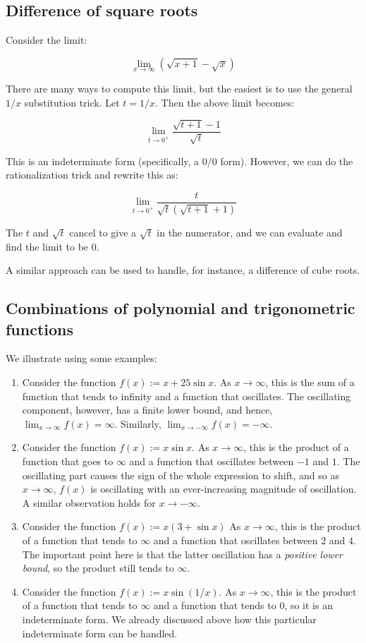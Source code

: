 \documentclass[10pt]{amsart}
\begin{document}
\subsection{Difference of square roots}

Consider the limit:

$$\lim_{x \to \infty}(\sqrt{x + 1} - \sqrt{x})$$

There are many ways to compute this limit, but the easiest is to use
the general $1/x$ substitution trick. Let $t = 1/x$. Then the above
limit becomes:

$$\lim_{t \to 0^+} \frac{\sqrt{t + 1} - 1}{\sqrt{t}}$$

This is an indeterminate form (specifically, a $0/0$ form). However,
we can do the rationalization trick and rewrite this as:

$$\lim_{t \to 0^+} \frac{t}{\sqrt{t}(\sqrt{t + 1} + 1)}$$

The $t$ and $\sqrt{t}$ cancel to give a $\sqrt{t}$ in the numerator,
and we can evaluate and find the limit to be $0$.

A similar approach can be used to handle, for instance, a difference
of cube roots.

\subsection{Combinations of polynomial and trigonometric functions}

We illustrate using some examples:

\begin{enumerate}
\item Consider the function $f(x) := x + 25 \sin x$. As $x \to
  \infty$, this is the sum of a function that tends to infinity and a
  function that oscillates. The oscillating component, however, has a
  finite lower bound, and hence, $\lim_{x \to \infty} f(x) =
  \infty$. Similarly, $\lim_{x \to -\infty} f(x) = -\infty$.
\item Consider the function $f(x) := x\sin x$. As $x \to \infty$, this
  is the product of a function that goes to $\infty$ and a function
  that oscillates between $-1$ and $1$. The oscillating part causes
  the sign of the whole expression to shift, and so as $x \to \infty$,
  $f(x)$ is oscillating with an ever-increasing magnitude of
  oscillation. A similar observation holds for $x \to -\infty$.
\item Consider the function $f(x) := x(3 + \sin x)$ As $x \to \infty$,
  this is the product of a function that tends to $\infty$ and a
  function that oscillates between $2$ and $4$. The important point
  here is that the latter oscillation has a {\em positive lower
    bound}, so the product still tends to $\infty$.
\item Consider the function $f(x) := x \sin(1/x)$. As $x \to \infty$,
  this is the product of a function that tends to $\infty$ and a
  function that tends to $0$, so it is an indeterminate form. We
  already discussed above how this particular indeterminate form can
  be handled.
\end{enumerate}
\end{document}
